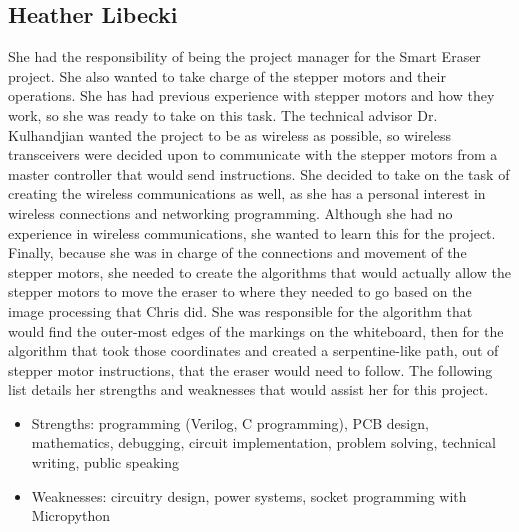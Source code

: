 \subsection{Heather Libecki}
She had the responsibility of being the project manager for the Smart Eraser project. She also wanted to take charge of the stepper motors and their operations. She has had previous experience with stepper motors and how they work, so she was ready to take on this task. The technical advisor Dr. Kulhandjian wanted the project to be as wireless as possible, so wireless transceivers were decided upon to communicate with the stepper motors from a master controller that would send instructions. She decided to take on the task of creating the wireless communications as well, as she has a personal interest in wireless connections and networking programming. Although she had no experience in wireless communications, she wanted to learn this for the project. Finally, because she was in charge of the connections and movement of the stepper motors, she needed to create the algorithms that would actually allow the stepper motors to move the eraser to where they needed to go based on the image processing that Chris did. She was responsible for the algorithm that would find the outer-most edges of the markings on the whiteboard, then for the algorithm that took those coordinates and created a serpentine-like path, out of stepper motor instructions, that the eraser would need to follow. The following list details her strengths and weaknesses that would assist her for this project.
\begin{itemize}
	\item Strengths: programming (Verilog, C programming), PCB design, mathematics, debugging, circuit implementation, problem solving, technical writing, public speaking
	\item Weaknesses: circuitry design, power systems, socket programming with Micropython 
\end{itemize} 
